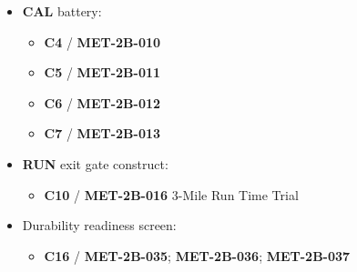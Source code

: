 \documentclass[10pt]{article}
\begin{document}
\begin{itemize}
\item \textbf{CAL} battery:
  \begin{itemize}
  \item \textbf{C4} / \textbf{MET-2B-010}
  \item \textbf{C5} / \textbf{MET-2B-011}
  \item \textbf{C6} / \textbf{MET-2B-012}
  \item \textbf{C7} / \textbf{MET-2B-013}
  \end{itemize}
\item \textbf{RUN} exit gate construct:
  \begin{itemize}
  \item \textbf{C10} / \textbf{MET-2B-016} 3-Mile Run Time Trial
  \end{itemize}
\item Durability readiness screen:
  \begin{itemize}
  \item \textbf{C16} / \textbf{MET-2B-035}; \textbf{MET-2B-036}; \textbf{MET-2B-037}
  \end{itemize}
\end{itemize}
\end{document}
